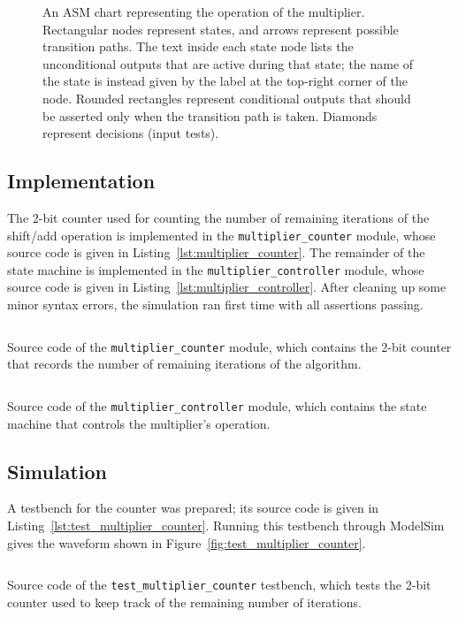 \documentclass[a4paper]{article}
\newcommand{\modulelisting}[3]{
  \begin{listing}[p]
    \linespread{.9}\inputminted[fontsize=\scriptsize,linenos]{systemverilog}{#2}
    \caption{#3}
    \label{lst:#1}
  \end{listing}
}
\begin{document}
\begin{figure}[p]
  \caption{An ASM chart representing the operation of the multiplier. Rectangular nodes represent states, and arrows represent possible transition paths. The text inside each state node lists the unconditional outputs that are active during that state; the name of the state is instead given by the label at the top-right corner of the node. Rounded rectangles represent conditional outputs that should be asserted only when the transition path is taken. Diamonds represent decisions (input tests).}
  \label{fig:asm}
\end{figure}

\subsection{Implementation}
\label{sec:seq:impl}

The 2-bit counter used for counting the number of remaining iterations of the shift/add operation is implemented in the \texttt{multiplier\_counter} module, whose source code is given in Listing~\ref{lst:multiplier_counter}. The remainder of the state machine is implemented in the \texttt{multiplier\_controller} module, whose source code is given in Listing~\ref{lst:multiplier_controller}. After cleaning up some minor syntax errors, the simulation ran first time with all assertions passing.

\modulelisting{multiplier_counter}{../src/multiplier/multiplier_counter.sv}
  {Source code of the \texttt{multiplier\_counter} module, which contains the 2-bit counter that records the number of remaining iterations of the algorithm.}

\modulelisting{multiplier_controller}{../src/multiplier/multiplier_controller.sv}
  {Source code of the \texttt{multiplier\_controller} module, which contains the state machine that controls the multiplier's operation.}

\subsection{Simulation}
\label{sec:seq:sim}

A testbench for the counter was prepared; its source code is given in Listing~\ref{lst:test_multiplier_counter}. Running this testbench through ModelSim gives the waveform shown in Figure~\ref{fig:test_multiplier_counter}.

\modulelisting{test_multiplier_counter}{../src/multiplier/test/test_multiplier_counter.sv}
  {Source code of the \texttt{test\_multiplier\_counter} testbench, which tests the 2-bit counter used to keep track of the remaining number of iterations.}
\end{document}
